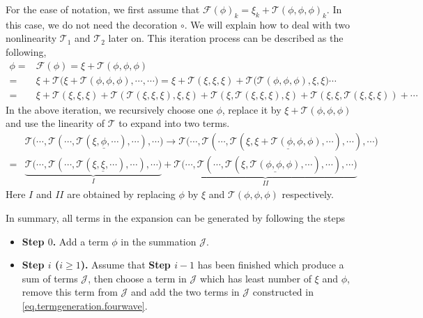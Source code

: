For the ease of notation, we first assume that $\mathcal{F}(\phi)_k=\xi_k+\mathcal{T}(\phi,\phi,\phi)_k$.
In this case, we do not need the decoration $\circ$. We will explain how to deal with two nonlinearity $\mathcal{T}_1$ and $\mathcal{T}_2$ later on. This iteration process can be described as the following, 
\begin{equation*}
\begin{split}
 \phi=&\mathcal{F}(\phi)=\xi+\mathcal{T}(\phi,\phi,\phi)
 \\
 =&\xi+\mathcal{T}\Big(\xi+\mathcal{T}(\phi,\phi,\phi),
 \cdots,
 \cdots\Big)=\xi+\mathcal{T}(\xi,\xi,\xi)+\mathcal{T}\Big(\mathcal{T}(\phi,\phi,\phi),
 \xi,
 \xi\Big)\cdots
 \\
 =&\xi+\mathcal{T}(\xi,\xi,\xi)+\mathcal{T}(\mathcal{T}(\xi,\xi,\xi),\xi,\xi)
 +\mathcal{T}(\xi,\mathcal{T}(\xi,\xi,\xi),\xi)
 +\mathcal{T}(\xi,\xi,\mathcal{T}(\xi,\xi,\xi))+\cdots
\end{split} 
\end{equation*}
In the above iteration, we recursively choose one $\phi$, replace it by $\xi+\mathcal{T}(\phi,\phi,\phi)$ and use the linearity of $\mathcal{T}$ to expand into two terms.
\begin{equation}\label{eq.termgeneration.fourwave}
\begin{split}
 &\mathcal{T}\Big(\cdots,\mathcal{T}(\cdots,\mathcal{T}(\xi,\underline{\phi},\cdots),\cdots),\cdots\Big)\rightarrow \mathcal{T}\Big(\cdots,\mathcal{T}(\cdots,\mathcal{T}(\xi,\underline{\xi+\mathcal{T}(\phi,\phi,\phi)},\cdots),\cdots),\cdots\Big)
 \\
 =& \underbrace{\mathcal{T}\Big(\cdots,\mathcal{T}(\cdots,\mathcal{T}(\xi,\underline{\xi},\cdots),\cdots),\cdots\Big)}_{I}
 +\underbrace{\mathcal{T}\Big(\cdots,\mathcal{T}(\cdots,\mathcal{T}(\xi,\underline{\mathcal{T}(\phi,\phi,\phi)},\cdots),\cdots),\cdots\Big)}_{II}
\end{split} 
\end{equation}
Here $I$ and $II$ are obtained by replacing $\phi$ by $\xi$ and $\mathcal{T}(\phi,\phi,\phi)$ respectively.

In summary, all terms in the expansion can be generated by following the steps

\begin{itemize}
 \item \textbf{Step $0$.} Add a term $\phi$ in the summation $\mathcal{J}$.
 \item \textbf{Step $i$ ($i\ge 1$).} Assume that \textbf{Step $i-1$} has been finished which produce a sum of terms $\mathcal{J}$, then choose a term in $\mathcal{J}$ which has least number of $\xi$ and $\phi$, remove this term from $\mathcal{J}$ and add the two terms in $\mathcal{J}$ constructed in \eqref{eq.termgeneration.fourwave}.
\end{itemize}

